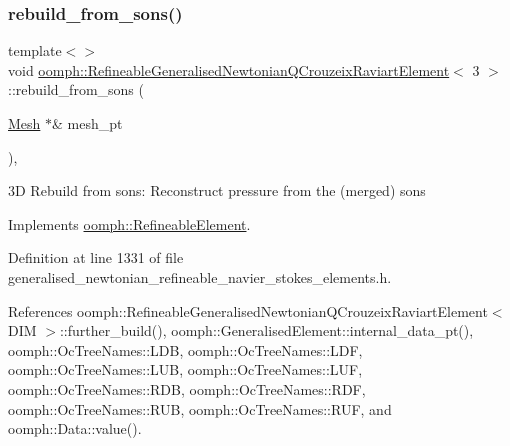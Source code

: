 \subsubsection{\texorpdfstring{rebuild\+\_\+from\+\_\+sons()}{rebuild\_from\_sons()}\hspace{0.1cm}{\footnotesize\ttfamily [3/3]}}
{\footnotesize\ttfamily template$<$$>$ \\
void \hyperlink{classoomph_1_1RefineableGeneralisedNewtonianQCrouzeixRaviartElement}{oomph\+::\+Refineable\+Generalised\+Newtonian\+Q\+Crouzeix\+Raviart\+Element}$<$ 3 $>$\+::rebuild\+\_\+from\+\_\+sons (\begin{DoxyParamCaption}\item[{\hyperlink{classoomph_1_1Mesh}{Mesh} $\ast$\&}]{mesh\+\_\+pt }\end{DoxyParamCaption})\hspace{0.3cm}{\ttfamily [inline]}, {\ttfamily [virtual]}}



3D Rebuild from sons\+: Reconstruct pressure from the (merged) sons 



Implements \hyperlink{classoomph_1_1RefineableElement_a33324be27833fa4b78279d17158215fa}{oomph\+::\+Refineable\+Element}.



Definition at line 1331 of file generalised\+\_\+newtonian\+\_\+refineable\+\_\+navier\+\_\+stokes\+\_\+elements.\+h.



References oomph\+::\+Refineable\+Generalised\+Newtonian\+Q\+Crouzeix\+Raviart\+Element$<$ D\+I\+M $>$\+::further\+\_\+build(), oomph\+::\+Generalised\+Element\+::internal\+\_\+data\+\_\+pt(), oomph\+::\+Oc\+Tree\+Names\+::\+L\+DB, oomph\+::\+Oc\+Tree\+Names\+::\+L\+DF, oomph\+::\+Oc\+Tree\+Names\+::\+L\+UB, oomph\+::\+Oc\+Tree\+Names\+::\+L\+UF, oomph\+::\+Oc\+Tree\+Names\+::\+R\+DB, oomph\+::\+Oc\+Tree\+Names\+::\+R\+DF, oomph\+::\+Oc\+Tree\+Names\+::\+R\+UB, oomph\+::\+Oc\+Tree\+Names\+::\+R\+UF, and oomph\+::\+Data\+::value().

\mbox{\label{classoomph_1_1RefineableGeneralisedNewtonianQCrouzeixRaviartElement_a5f0ca1585eef5cae43ea9eafde474991}} 
